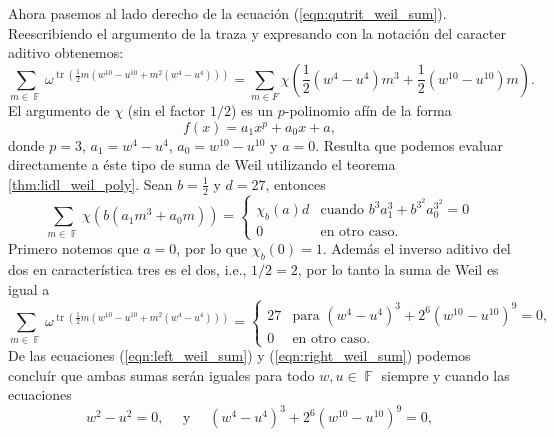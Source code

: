 \documentclass[a4paper]{report}
\DeclareMathOperator{\F}{\mathbb{F}}
\DeclareMathOperator{\tr}{tr}
\begin{document}
  Ahora pasemos al lado derecho de la ecuación
  (\ref{eqn:qutrit_weil_sum}). Reescribiendo el argumento de
  la traza y expresando con la notación del caracter aditivo
  obtenemos:
  \begin{equation}
    \sum_{m \in \F}^{} \omega^{\tr\left( \frac{1}{2} m\left(
    w^{10}-u^{10} + m^2(w^{4}-u^{4})\right)  \right) }
    = 
    \sum_{m \in F}^{} \chi\left(
      \frac{1}{2}
      \left( w^{4} - u^{4} \right) m^3
      + \frac{1}{2}
      \left( w^{10} - u^{10} \right) m 
    \right).
  \end{equation}
  El argumento de $\chi$ (sin el factor $1 / 2$) es un
  $p$-polinomio afín de la forma
  \begin{equation}
    f(x) = a_1 x^{p} + a_0 x + a,
  \end{equation}
  donde $p = 3$, $a_1 = w^{4} - u^{4}$,  $a_0 = w^{10} -
  u^{10}$ y $a = 0$. Resulta que podemos evaluar
  directamente a éste tipo de suma de Weil utilizando el
  teorema \ref{thm:lidl_weil_poly}. Sean $b = \frac{1}{2}$ y
  $d = 27$, entonces
  \begin{equation}
    \sum_{m \in \F}^{} \chi\left(
      b \left(
        a_1 m^{3} + a_0 m
      \right)
    \right)
    = 
    \begin{cases}
      \chi_{b}(a) d & \text{cuando } b^3 a_1^3 + b^{3^2}
      a_0^{3^2} = 0 \\
      0 & \text{en otro caso}.
    \end{cases}
  \end{equation}
  Primero notemos que $a = 0$, por lo que $\chi_b(0) = 1$.
  Además el inverso aditivo del dos en característica tres
  es el dos, i.e., $1 / 2 = 2$, por lo tanto la suma de Weil
  es igual a
  \begin{equation}
    \label{eqn:right_weil_sum}
    \sum_{m \in \F}^{} \omega^{\tr\left( \frac{1}{2} m\left(
    w^{10}-u^{10} + m^2(w^{4}-u^{4})\right)  \right) }
    =
    \begin{cases}
      27 & \text{para } \left( w^{4}-u^{4} \right) ^3 +
      2^{6} \left( w^{10} - u^{10} \right) ^{9} = 0, \\
      0 & \text{en otro caso}.
    \end{cases}
  \end{equation}
  De las ecuaciones (\ref{eqn:left_weil_sum}) y
  (\ref{eqn:right_weil_sum}) podemos concluír que ambas
  sumas serán iguales para todo $w, u \in \F$ siempre y
  cuando las ecuaciones
  \begin{equation}
    w^2 - u^2 = 0,
    \quad
    \text{ y }
    \quad
    \left( w^{4}-u^{4} \right)^3
    + 2^{6} \left( w^{10} - u^{10} \right)^{9} = 0,
  \end{equation}
\end{document}
